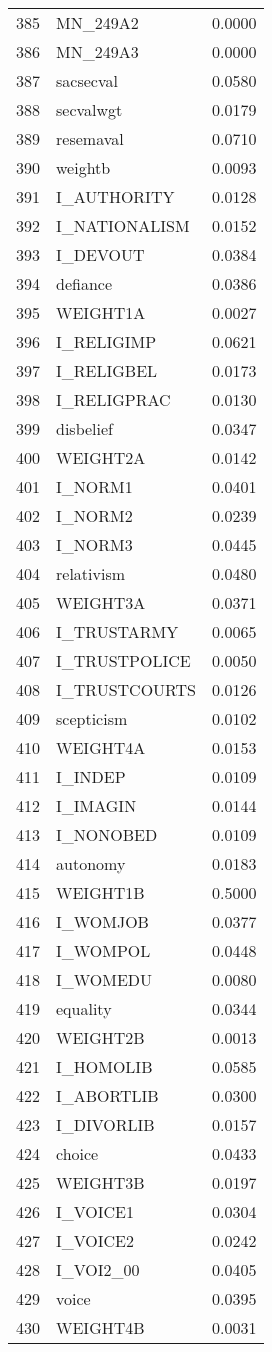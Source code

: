 \documentclass{amsart}
\begin{document}
\begin{longtable}{rlr}
  385 & MN\_249A2 & 0.0000 \\ 
  386 & MN\_249A3 & 0.0000 \\ 
  387 & sacsecval & 0.0580 \\ 
  388 & secvalwgt & 0.0179 \\ 
  389 & resemaval & 0.0710 \\ 
  390 & weightb & 0.0093 \\ 
  391 & I\_AUTHORITY & 0.0128 \\ 
  392 & I\_NATIONALISM & 0.0152 \\ 
  393 & I\_DEVOUT & 0.0384 \\ 
  394 & defiance & 0.0386 \\ 
  395 & WEIGHT1A & 0.0027 \\ 
  396 & I\_RELIGIMP & 0.0621 \\ 
  397 & I\_RELIGBEL & 0.0173 \\ 
  398 & I\_RELIGPRAC & 0.0130 \\ 
  399 & disbelief & 0.0347 \\ 
  400 & WEIGHT2A & 0.0142 \\ 
  401 & I\_NORM1 & 0.0401 \\ 
  402 & I\_NORM2 & 0.0239 \\ 
  403 & I\_NORM3 & 0.0445 \\ 
  404 & relativism & 0.0480 \\ 
  405 & WEIGHT3A & 0.0371 \\ 
  406 & I\_TRUSTARMY & 0.0065 \\ 
  407 & I\_TRUSTPOLICE & 0.0050 \\ 
  408 & I\_TRUSTCOURTS & 0.0126 \\ 
  409 & scepticism & 0.0102 \\ 
  410 & WEIGHT4A & 0.0153 \\ 
  411 & I\_INDEP & 0.0109 \\ 
  412 & I\_IMAGIN & 0.0144 \\ 
  413 & I\_NONOBED & 0.0109 \\ 
  414 & autonomy & 0.0183 \\ 
  415 & WEIGHT1B & 0.5000 \\ 
  416 & I\_WOMJOB & 0.0377 \\ 
  417 & I\_WOMPOL & 0.0448 \\ 
  418 & I\_WOMEDU & 0.0080 \\ 
  419 & equality & 0.0344 \\ 
  420 & WEIGHT2B & 0.0013 \\ 
  421 & I\_HOMOLIB & 0.0585 \\ 
  422 & I\_ABORTLIB & 0.0300 \\ 
  423 & I\_DIVORLIB & 0.0157 \\ 
  424 & choice & 0.0433 \\ 
  425 & WEIGHT3B & 0.0197 \\ 
  426 & I\_VOICE1 & 0.0304 \\ 
  427 & I\_VOICE2 & 0.0242 \\ 
  428 & I\_VOI2\_00 & 0.0405 \\ 
  429 & voice & 0.0395 \\ 
  430 & WEIGHT4B & 0.0031 \\ 
   \hline
\hline
\end{longtable}
\end{document}
